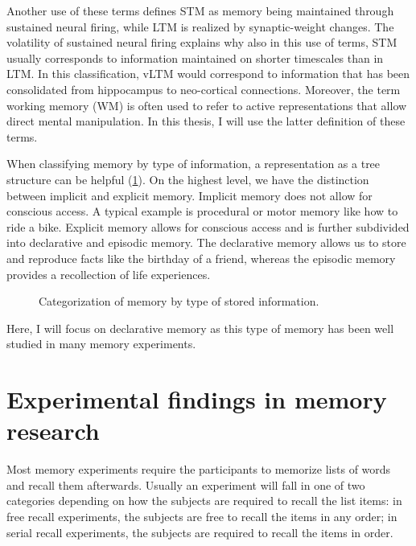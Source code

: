 Another use of these terms defines STM as memory being maintained through sustained neural firing, while LTM is realized by synaptic-weight changes.
The volatility of sustained neural firing explains why also in this use of terms, STM usually corresponds to information maintained on shorter timescales than in LTM\@.
In this classification, vLTM would correspond to information that has been consolidated from hippocampus to neo-cortical connections.
Moreover, the term working memory (WM) is often used to refer to active representations that allow direct mental manipulation.
In this thesis, I will use the latter definition of these terms.

When classifying memory by type of information, a representation as a tree structure can be helpful (\cref{fig:memtypes}).
On the highest level, we have the distinction between implicit and explicit memory.
Implicit memory does not allow for conscious access.
A typical example is procedural or motor memory like how to ride a bike.
Explicit memory allows for conscious access and is further subdivided into declarative and episodic memory.
The declarative memory allows us to store and reproduce facts like the birthday of a friend, whereas the episodic memory provides a recollection of life experiences.
\begin{figure}
    \centering
    \caption{Categorization of memory by type of stored 
        information.}\label{fig:memtypes}
\end{figure}

Here, I will focus on declarative memory as this type of memory has been well studied in many memory experiments.


\section{Experimental findings in memory research}\label{sec:exp-findings}
Most memory experiments require the participants to memorize lists of words and recall them afterwards.
Usually an experiment will fall in one of two categories depending on how the subjects are required to recall the list items: in free recall experiments, the subjects are free to recall the items in any order; in serial recall experiments, the subjects are required to recall the items in order.

